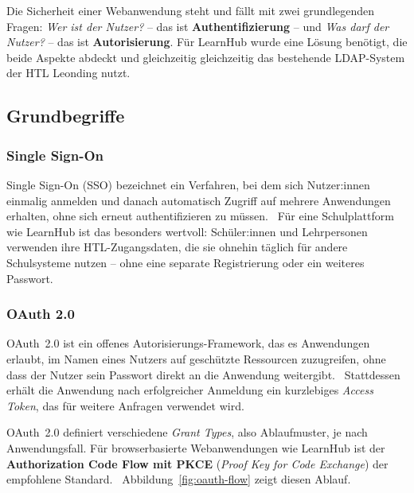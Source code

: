 \setauthor{\firstauthor}


Die Sicherheit einer Webanwendung steht und fällt mit zwei grundlegenden
Fragen: \textit{Wer ist der Nutzer?} -- das ist \textbf{Authentifizierung}
-- und \textit{Was darf der Nutzer?} -- das ist \textbf{Autorisierung}.
Für LearnHub wurde eine Lösung benötigt, die beide Aspekte abdeckt und
gleichzeitig gleichzeitig das bestehende LDAP-System der HTL Leonding nutzt.

\subsection{Grundbegriffe}

\subsubsection{Single Sign-On}

Single Sign-On (SSO) bezeichnet ein Verfahren, bei dem sich
Nutzer:innen einmalig anmelden und danach automatisch Zugriff auf
mehrere Anwendungen erhalten, ohne sich erneut authentifizieren zu
müssen.~\cite{ibm-sso} Für eine Schulplattform wie LearnHub ist das
besonders wertvoll: Schüler:innen und Lehrpersonen verwenden ihre
HTL-Zugangsdaten, die sie ohnehin täglich für andere Schulsysteme
nutzen -- ohne eine separate Registrierung oder ein weiteres Passwort.

\subsubsection{OAuth 2.0}

OAuth~2.0 ist ein offenes Autorisierungs-Framework, das es Anwendungen
erlaubt, im Namen eines Nutzers auf geschützte Ressourcen zuzugreifen,
ohne dass der Nutzer sein Passwort direkt an die Anwendung
weitergibt.~\cite{oauth2-rfc} Stattdessen erhält die Anwendung nach
erfolgreicher Anmeldung ein kurzlebiges \textit{Access Token}, das für
weitere Anfragen verwendet wird.

OAuth~2.0 definiert verschiedene \textit{Grant Types}, also
Ablaufmuster, je nach Anwendungsfall. Für browserbasierte Webanwendungen
wie LearnHub ist der \textbf{Authorization Code Flow mit PKCE}
(\textit{Proof Key for Code Exchange}) der empfohlene
Standard.~\cite{oauth2-rfc} Abbildung~\ref{fig:oauth-flow} zeigt diesen
Ablauf.

